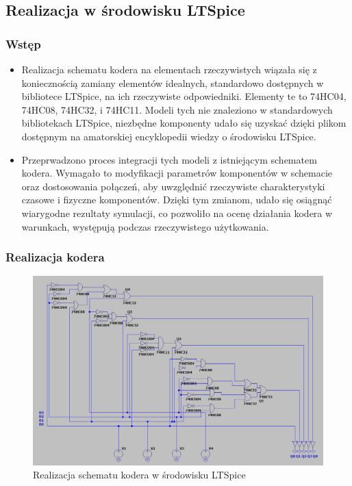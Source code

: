 \documentclass{article}
\begin{document}
\newpage
\subsection{Realizacja w środowisku LTSpice} 
\subsubsection{Wstęp}
\begin{itemize}
    \item 
    Realizacja schematu kodera na elementach rzeczywistych wiązała się z koniecznością zamiany elementów idealnych, standardowo dostępnych w bibliotece LTSpice, na ich rzeczywiste odpowiedniki. Elementy te to 74HC04, 74HC08, 74HC32, i 74HC11. \cite{hc04} \cite{hc08} \cite{hc32} \cite{hc11} Modeli tych nie znaleziono w standardowych bibliotekach LTSpice, niezbędne komponenty udało się uzyskać dzięki plikom dostępnym na amatorskiej encyklopedii wiedzy o środowisku LTSpice.  \cite{ltwiki} \cite{borod}
    \item 
    Przeprwadzono proces integracji tych modeli z istniejącym schematem kodera. Wymagało to modyfikacji parametrów komponentów w schemacie oraz dostosowania połączeń, aby uwzględnić rzeczywiste charakterystyki czasowe i fizyczne komponentów. Dzięki tym zmianom, udało się osiągnąć wiarygodne rezultaty symulacji, co pozwoliło na ocenę działania kodera w warunkach, występują podczas rzeczywistego użytkowania.
\end{itemize}

\subsubsection{Realizacja kodera}
\begin{figure}[H]
    \centering
    \begin{adjustbox}{center}
        \includegraphics[width=1.1\textwidth]{ltspice-rzeczywiste.png}
    \end{adjustbox}
    \caption{Realizacja schematu kodera w środowisku LTSpice}
    \label{fig:mojobrazek}
\end{figure}
\end{document}
